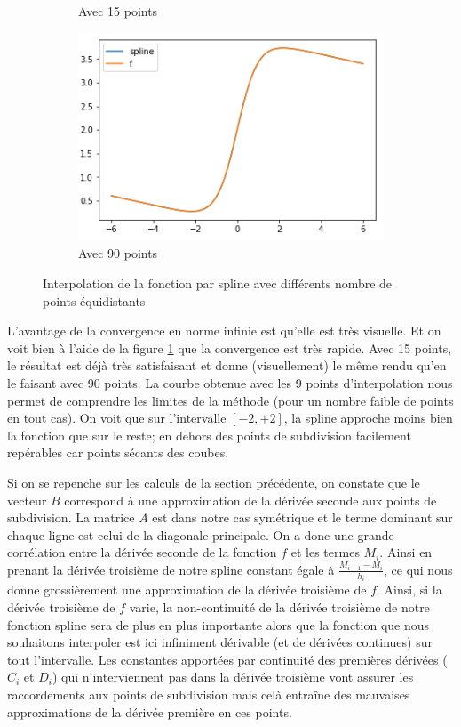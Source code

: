 \begin{figure}[h]
\begin{subfigure}[b]{0.4\linewidth}
    \caption{Avec 15 points}
  \end{subfigure}
  \begin{subfigure}[b]{0.4\linewidth}
    \includegraphics[width=\linewidth]{fig8}
    \caption{Avec 90 points}
  \end{subfigure}
  \caption{Interpolation de la fonction par spline avec différents nombre de points équidistants}
  \label{fig:6:fspl}
\end{figure}

L'avantage de la convergence en norme infinie est qu'elle est très visuelle. Et on voit bien à l'aide de la figure \ref{fig:6:fspl} que la convergence est très rapide.
Avec 15 points, le résultat est déjà très satisfaisant et donne (visuellement) le même rendu qu'en le faisant avec 90 points.
La courbe obtenue avec les 9 points d'interpolation nous permet de comprendre les limites de la méthode (pour un nombre faible de points en tout cas).
On voit que sur l'intervalle $[-2,+2]$, la spline approche moins bien la fonction que sur le reste; en dehors des points de subdivision facilement repérables car
points sécants des coubes.

Si on se repenche sur les calculs de la section précédente, on constate que le vecteur $B$ correspond à une approximation de la dérivée seconde aux
points de subdivision. La matrice $A$ est dans notre cas symétrique et le terme dominant sur chaque ligne est celui de la diagonale principale. On a donc
une grande corrélation entre la dérivée seconde de la fonction $f$ et les termes $M_i$. Ainsi en prenant la dérivée troisième de notre spline constant égale à
$\frac{M_{i+1} - M_i}{h_i}$, ce qui nous donne grossièrement une approximation de la dérivée troisième de $f$. Ainsi, si la dérivée troisième de $f$ varie,
la non-continuité de la dérivée troisième de notre fonction spline sera de plus en plus importante alors que la fonction que nous souhaitons interpoler est ici
infiniment dérivable (et de dérivées continues) sur tout l'intervalle. Les constantes apportées par continuité des premières dérivées ($C_i$ et $D_i$) qui
n'interviennent pas dans la dérivée troisième vont assurer les raccordements aux points de subdivision mais celà entraîne des mauvaises approximations
de la dérivée première en ces points.

